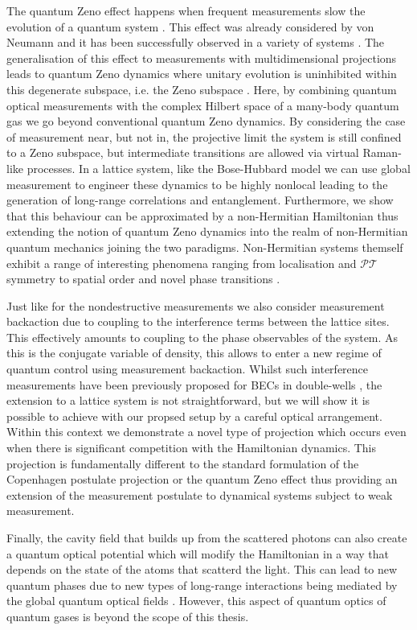 The quantum Zeno effect happens when frequent measurements slow the
evolution of a quantum system \cite{misra1977, facchi2008}. This
effect was already considered by von Neumann and it has been
successfully observed in a variety of systems \cite{itano1990,
  nagels1997, kwiat1999, balzer2000, streed2006, hosten2006,
  bernu2008}. The generalisation of this effect to measurements with
multidimensional projections leads to quantum Zeno dynamics where
unitary evolution is uninhibited within this degenerate subspace,
i.e. the Zeno subspace \cite{facchi2008, raimond2010, raimond2012,
  signoles2014}. Here, by combining quantum optical measurements with
the complex Hilbert space of a many-body quantum gas we go beyond
conventional quantum Zeno dynamics. By considering the case of
measurement near, but not in, the projective limit the system is still
confined to a Zeno subspace, but intermediate transitions are allowed
via virtual Raman-like processes. In a lattice system, like the
Bose-Hubbard model we can use global measurement to engineer these
dynamics to be highly nonlocal leading to the generation of long-range
correlations and entanglement. Furthermore, we show that this
behaviour can be approximated by a non-Hermitian Hamiltonian thus
extending the notion of quantum Zeno dynamics into the realm of
non-Hermitian quantum mechanics joining the two
paradigms. Non-Hermitian systems themself exhibit a range of
interesting phenomena ranging from localisation \cite{hatano1996,
  refael2006} and $\mathcal{PT}$ symmetry \cite{bender1998,
  giorgi2010, zhang2013} to spatial order \cite{otterbach2014} and
novel phase transitions \cite{lee2014prx, lee2014prl}.

Just like for the nondestructive measurements we also consider
measurement backaction due to coupling to the interference terms
between the lattice sites. This effectively amounts to coupling to the
phase observables of the system. As this is the conjugate variable of
density, this allows to enter a new regime of quantum control using
measurement backaction. Whilst such interference measurements have
been previously proposed for BECs in double-wells \cite{cirac1996,
  castin1997, ruostekoski1997}, the extension to a lattice system is
not straightforward, but we will show it is possible to achieve with
our propsed setup by a careful optical arrangement. Within this
context we demonstrate a novel type of projection which occurs even
when there is significant competition with the Hamiltonian
dynamics. This projection is fundamentally different to the standard
formulation of the Copenhagen postulate projection or the quantum Zeno
effect \cite{misra1977, facchi2008} thus providing an extension of the
measurement postulate to dynamical systems subject to weak
measurement.

Finally, the cavity field that builds up from the scattered photons
can also create a quantum optical potential which will modify the
Hamiltonian in a way that depends on the state of the atoms that
scatterd the light. This can lead to new quantum phases due to new
types of long-range interactions being mediated by the global quantum
optical fields \cite{caballero2015, caballero2015njp, caballero2016,
  caballero2016a}. However, this aspect of quantum optics of quantum
gases is beyond the scope of this thesis.

